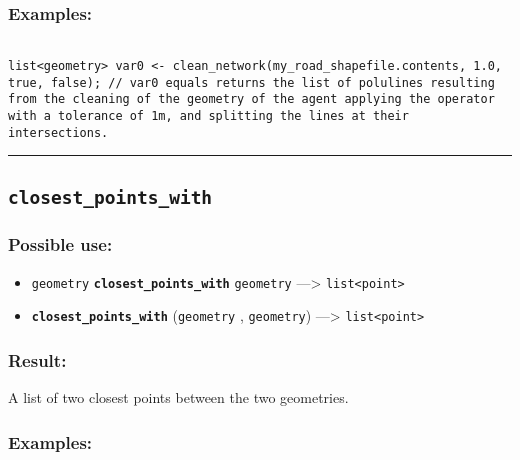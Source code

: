 \documentclass[]{book}
\providecommand{\tightlist}{%
  \setlength{\itemsep}{0pt}\setlength{\parskip}{0pt}}
\theoremstyle{definition}
\theoremstyle{definition}
\theoremstyle{definition}
\theoremstyle{remark}
\begin{document}
\subsubsection{Examples:}\label{examples-66}

\begin{verbatim}
 
list<geometry> var0 <- clean_network(my_road_shapefile.contents, 1.0, true, false); // var0 equals returns the list of polulines resulting from the cleaning of the geometry of the agent applying the operator with a tolerance of 1m, and splitting the lines at their intersections.
\end{verbatim}

\begin{center}\rule{0.5\linewidth}{\linethickness}\end{center}

\subsection{\texorpdfstring{\texttt{closest\_points\_with}}{closest\_points\_with}}\label{closest_points_with}

\subsubsection{Possible use:}\label{possible-use-88}

\begin{itemize}
\tightlist
\item
  \texttt{geometry} \textbf{\texttt{closest\_points\_with}}
  \texttt{geometry} ---\textgreater{}
  \texttt{list\textless{}point\textgreater{}}
\item
  \textbf{\texttt{closest\_points\_with}} (\texttt{geometry} ,
  \texttt{geometry}) ---\textgreater{}
  \texttt{list\textless{}point\textgreater{}}
\end{itemize}

\subsubsection{Result:}\label{result-86}

A list of two closest points between the two geometries.

\subsubsection{Examples:}\label{examples-67}
\end{document}
